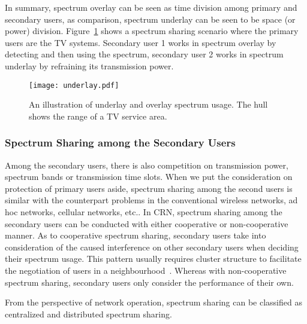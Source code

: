 In summary, spectrum overlay can be seen as time division among primary and secondary users, as comparison, spectrum underlay can be seen to be space (or power) division.
Figure~\ref{underlay} shows a spectrum sharing scenario where the primary users are the TV systems.
Secondary user 1 works in spectrum overlay by detecting and then using the spectrum, secondary user 2 works in spectrum underlay by refraining its transmission power.
	\begin{figure}[h!]
	  \centering
	  \texttt{[image: underlay.pdf]}
	  \caption{An illustration of underlay and overlay spectrum usage. The hull shows the range of a TV service area.}
	\label{underlay}
	\end{figure}

\subsubsection{Spectrum Sharing among the Secondary Users}
Among the secondary users, there is also competition on transmission power, spectrum bands or transmission time slots.
When we put the consideration on protection of primary users aside, spectrum sharing among the second users is similar with the counterpart problems in the conventional wireless networks, \ie ad hoc networks, cellular networks, etc..
In CRN, spectrum sharing among the secondary users can be conducted with either cooperative or non-cooperative manner.
As to cooperative spectrum sharing, secondary users take into consideration of the caused interference on other secondary users when deciding their spectrum usage.
This pattern usually requires cluster structure to facilitate the negotiation of users in a neighbourhood~\cite{Chen07}.
Whereas with non-cooperative spectrum sharing, secondary users only consider the performance of their own.








From the perspective of network operation, spectrum sharing can be classified as centralized and distributed spectrum sharing.


